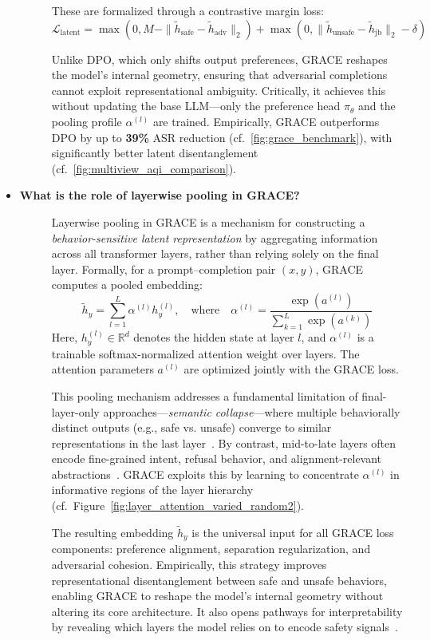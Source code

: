 \begin{itemize}[leftmargin=15pt,nolistsep]
\begin{description}
These are formalized through a contrastive margin loss:
\[
\mathcal{L}_{\text{latent}} = \max(0, M - \|\tilde{h}_{\text{safe}} - \tilde{h}_{\text{adv}}\|_2) + \max(0, \|\tilde{h}_{\text{unsafe}} - \tilde{h}_{\text{jb}}\|_2 - \delta)
\]

\medskip
Unlike DPO, which only shifts output preferences, GRACE reshapes the model’s internal geometry, ensuring that adversarial completions cannot exploit representational ambiguity. Critically, it achieves this without updating the base LLM—only the preference head $\pi_\theta$ and the pooling profile $\alpha^{(l)}$ are trained. Empirically, GRACE outperforms DPO by up to \textbf{39\%} ASR reduction (cf.~\cref{fig:grace_benchmark}), with significantly better latent disentanglement (cf.~\cref{fig:multiview_aqi_comparison}).

\end{description}


\item[\ding{93}] { \selectfont \textbf{What is the role of layerwise pooling in GRACE?}}
\begin{description}
\item[] 
Layerwise pooling in GRACE is a mechanism for constructing a \emph{behavior-sensitive latent representation} by aggregating information across all transformer layers, rather than relying solely on the final layer. Formally, for a prompt--completion pair \((x, y)\), GRACE computes a pooled embedding:
\[
\tilde{h}_y = \sum_{l=1}^L \alpha^{(l)} h_y^{(l)}, \quad \text{where} \quad \alpha^{(l)} = \frac{\exp(a^{(l)})}{\sum_{k=1}^{L} \exp(a^{(k)})}
\]
Here, \(h_y^{(l)} \in \mathbb{R}^d\) denotes the hidden state at layer \(l\), and \(\alpha^{(l)}\) is a trainable softmax-normalized attention weight over layers. The attention parameters \(a^{(l)}\) are optimized jointly with the GRACE loss.

This pooling mechanism addresses a fundamental limitation of final-layer-only approaches—\emph{semantic collapse}—where multiple behaviorally distinct outputs (e.g., safe vs. unsafe) converge to similar representations in the last layer~\citep{belrose2023language, mu2023layers}. By contrast, mid-to-late layers often encode fine-grained intent, refusal behavior, and alignment-relevant abstractions~\citep{liu2023lost}. GRACE exploits this by learning to concentrate \(\alpha^{(l)}\) in informative regions of the layer hierarchy (cf.~Figure~\ref{fig:layer_attention_varied_random2}).

The resulting embedding \(\tilde{h}_y\) is the universal input for all GRACE loss components: preference alignment, separation regularization, and adversarial cohesion. Empirically, this strategy improves representational disentanglement between safe and unsafe behaviors, enabling GRACE to reshape the model's internal geometry without altering its core architecture. It also opens pathways for interpretability by revealing which layers the model relies on to encode safety signals~\citep{nanda2023progress}.


\end{description}
\end{itemize}
